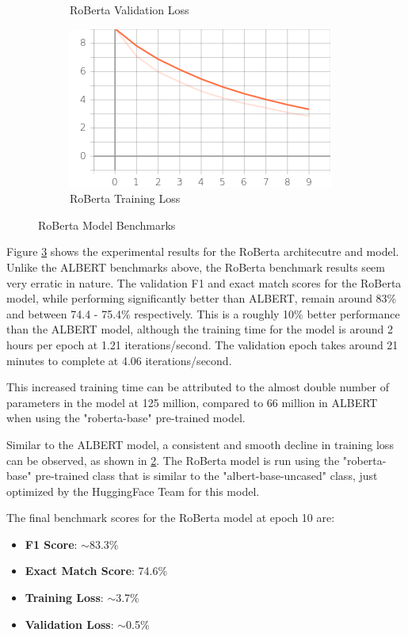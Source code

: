 \documentclass[a4paper,12pt]{report}
\begin{document}
\begin{figure}
\begin{subfigure}[b]{0.4\textwidth}
		\caption{\small RoBerta Validation Loss}
		\label{robertaValLoss}
	\end{subfigure}
	\hfill
	\begin{subfigure}[b]{0.4\textwidth}
		\centering
		\includegraphics[width=\textwidth]{../images/Roberta_Train_Loss.png}
		\caption{\small RoBerta Training Loss}
		\label{robertaTrainloss}
	\end{subfigure}
	\caption{RoBerta Model Benchmarks}
	\label{robertaBenchmarks}
\end{figure}

	Figure \ref{robertaBenchmarks} shows the experimental results for the RoBerta architecutre and model. Unlike the ALBERT benchmarks above, the RoBerta benchmark results seem very erratic in nature. The validation F1 and exact match scores for the RoBerta model, while performing significantly better than ALBERT, remain around 83\% and between 74.4 - 75.4\% respectively. This is a roughly 10\% better performance than the ALBERT model, although the training time for the model is around 2 hours per epoch at 1.21 iterations/second. The validation epoch takes around 21 minutes to complete at 4.06 iterations/second.

	This increased training time can be attributed to the almost double number of parameters in the model at 125 million, compared to 66 million in ALBERT when using the "roberta-base" pre-trained model.

	Similar to the ALBERT model, a consistent and smooth decline in training loss can be observed, as shown in \ref{robertaTrainloss}. The RoBerta model is run using the "roberta-base" pre-trained class that is similar to the "albert-base-uncased" class, just optimized by the HuggingFace Team for this model.

	The final benchmark scores for the RoBerta model at epoch 10 are:
	\begin{itemize}
		\item \textbf{F1 Score}:  $\sim$83.3\%
		\item \textbf{Exact Match Score}: 74.6\%
		\item \textbf{Training Loss}:  $\sim$3.7\%
		\item \textbf{Validation Loss}: $\sim$0.5\%
	\end{itemize}
\end{document}
